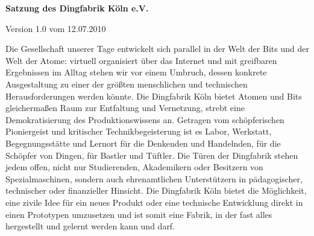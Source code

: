\documentclass[12pt,ngerman]{scrartcl}
\begin{document}
\begin{center}
\Huge\textbf{Satzung des Dingfabrik Köln e.V.}\vspace*{1cm}

\Large{Version 1.0 vom 12.07.2010}
\end{center}\vspace*{1cm}

Die Gesellschaft unserer Tage entwickelt sich parallel in der Welt der Bits und der Welt der Atome: virtuell organisiert über das Internet und mit greifbaren Ergebnissen im Alltag stehen wir vor einem Umbruch, dessen konkrete Ausgestaltung zu einer der größten menschlichen und technischen Herausforderungen werden könnte. Die Dingfabrik Köln bietet Atomen und Bits gleichermaßen Raum zur Entfaltung und Vernetzung, strebt eine Demokratisierung des Produktionswissens an. Getragen vom schöpferischen Pioniergeist und kritischer Technikbegeisterung ist es Labor, Werkstatt, Begegnungsstätte und Lernort für die Denkenden und Handelnden, für die Schöpfer von Dingen, für Bastler und Tüftler. Die Türen der Dingfabrik stehen jedem offen, nicht nur Studierenden, Akademikern oder Besitzern von Spezialmaschinen, sondern auch ehrenamtlichen Unterstützern in pädagogischer, technischer oder finanzieller Hinsicht. Die Dingfabrik Köln bietet die Möglichkeit, eine zivile Idee für ein neues Produkt oder eine technische Entwicklung direkt in einen Prototypen umzusetzen und ist somit eine Fabrik, in der fast alles hergestellt und gelernt werden kann und darf.
\end{document}
